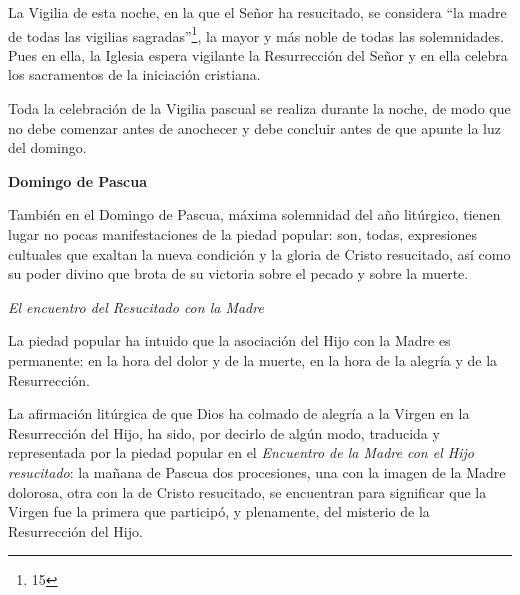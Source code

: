 			\begin{bodyintro}La Vigilia de esta noche, en la que el Señor ha resucitado, se considera “la madre de todas las vigilias sagradas”\footnote{15}, la mayor y más noble de todas las solemnidades. Pues en ella, la Iglesia espera vigilante la Resurrección del Señor y en ella celebra los sacramentos de la iniciación cristiana.\end{bodyintro}
			
			\begin{bodyintro}Toda la celebración de la Vigilia pascual se realiza durante la noche, de modo que no debe comenzar antes de anochecer y debe concluir antes de que apunte la luz del domingo.\end{bodyintro}
			
			\begin{bodyintro}\textbf{Domingo de Pascua}\end{bodyintro}
			
			\begin{bodyintro}También en el Domingo de Pascua, máxima solemnidad del año litúrgico, tienen lugar no pocas manifestaciones de la piedad popular: son, todas, expresiones cultuales que exaltan la nueva condición y la gloria de Cristo resucitado, así como su poder divino que brota de su victoria sobre el pecado y sobre la muerte.\end{bodyintro}
			
			\begin{bodyintro}\textit{El encuentro del Resucitado con la Madre}\end{bodyintro}
			
			\begin{bodyintro}La piedad popular ha intuido que la asociación del Hijo con la Madre es permanente: en la hora del dolor y de la muerte, en la hora de la alegría y de la Resurrección.\end{bodyintro}
			
			\begin{bodyintro}La afirmación litúrgica de que Dios ha colmado de alegría a la Virgen en la Resurrección del Hijo, ha sido, por decirlo de algún modo, traducida y representada por la piedad popular en el \textit{Encuentro de la Madre con el Hijo resucitado}: la mañana de Pascua dos procesiones, una con la imagen de la Madre dolorosa, otra con la de Cristo resucitado, se encuentran para significar que la Virgen fue la primera que participó, y plenamente, del misterio de la Resurrección del Hijo.\end{bodyintro}
			
